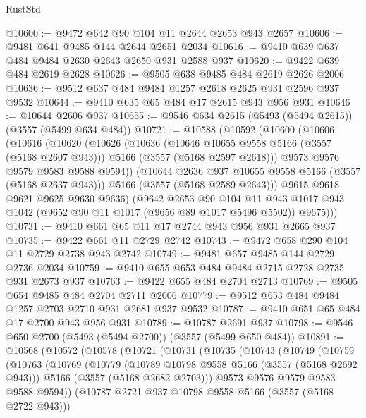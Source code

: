 \begin{lexlean}{RustStd}
\begin{coremodule}
@10600 := @9472 @642 @90 @104 @11 @2644 @2653 @943 @2657
@10606 := @9481 @641 @9485 @144 @2644 @2651 @2034
@10616 := @9410 @639 @637 @484 @9484 @2630 @2643 @2650 @931 @2588 @937
@10620 := @9422 @639 @484 @2619 @2628
@10626 := @9505 @638 @9485 @484 @2619 @2626 @2006
@10636 := @9512 @637 @484 @9484 @1257 @2618 @2625 @931 @2596 @937 @9532
@10644 := @9410 @635 @65 @484 @17 @2615 @943 @956 @931
@10646 := @10644 @2606 @937
@10655 := @9546 @634 @2615 (@5493 (@5494 @2615)) (@3557 (@5499 @634 @484))
@10721 := @10588
    (@10592
      (@10600
        (@10606
          (@10616
            (@10620
              (@10626
                (@10636
                  (@10646 @10655 @9558 @5166 (@3557 (@5168 @2607 @943)))
                  @5166
                  (@3557 (@5168 @2597 @2618)))
                @9573
                @9576
                @9579
                @9583
                @9588
                @9594))
            (@10644 @2636 @937 @10655 @9558 @5166 (@3557 (@5168 @2637 @943)))
            @5166
            (@3557 (@5168 @2589 @2643)))
          @9615
          @9618
          @9621
          @9625
          @9630
          @9636)
        (@9642
          @2653
          @90
          @104
          @11
          @943
          @1017
          @943
          @1042
          (@9652 @90 @11 @1017 (@9656 @89 @1017 @5496 @5502))
          @9675)))
@10731 := @9410 @661 @65 @11 @17 @2744 @943 @956 @931 @2665 @937
@10735 := @9422 @661 @11 @2729 @2742
@10743 := @9472 @658 @290 @104 @11 @2729 @2738 @943 @2742
@10749 := @9481 @657 @9485 @144 @2729 @2736 @2034
@10759 := @9410 @655 @653 @484 @9484 @2715 @2728 @2735 @931 @2673 @937
@10763 := @9422 @655 @484 @2704 @2713
@10769 := @9505 @654 @9485 @484 @2704 @2711 @2006
@10779 := @9512 @653 @484 @9484 @1257 @2703 @2710 @931 @2681 @937 @9532
@10787 := @9410 @651 @65 @484 @17 @2700 @943 @956 @931
@10789 := @10787 @2691 @937
@10798 := @9546 @650 @2700 (@5493 (@5494 @2700)) (@3557 (@5499 @650 @484))
@10891 := @10568
    (@10572
      (@10578
        (@10721
          (@10731
            (@10735
              (@10743
                (@10749
                  (@10759
                    (@10763
                      (@10769
                        (@10779
                          (@10789 @10798 @9558 @5166 (@3557 (@5168 @2692 @943)))
                          @5166
                          (@3557 (@5168 @2682 @2703)))
                        @9573
                        @9576
                        @9579
                        @9583
                        @9588
                        @9594))
                    (@10787 @2721 @937 @10798 @9558 @5166 (@3557 (@5168 @2722 @943)))

\end{coremodule}
\end{lexlean}
